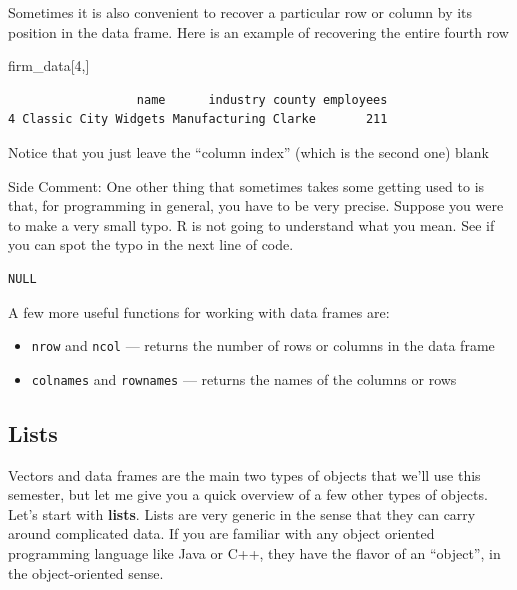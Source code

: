 \documentclass[
  letterpaper,
  DIV=11,
  numbers=noendperiod]{scrreprt}
\newenvironment{Shaded}{\begin{snugshade}}{\end{snugshade}}
\newcommand{\DecValTok}[1]{\textcolor[rgb]{0.68,0.00,0.00}{#1}}
\newcommand{\NormalTok}[1]{\textcolor[rgb]{0.00,0.23,0.31}{#1}}
\newcommand{\SpecialCharTok}[1]{\textcolor[rgb]{0.37,0.37,0.37}{#1}}
\begin{document}
Sometimes it is also convenient to recover a particular row or column by
its position in the data frame. Here is an example of recovering the
entire fourth row

\begin{Shaded}
\begin{Highlighting}[]
\NormalTok{firm\_data[}\DecValTok{4}\NormalTok{,]}
\end{Highlighting}
\end{Shaded}

\begin{verbatim}
                  name      industry county employees
4 Classic City Widgets Manufacturing Clarke       211
\end{verbatim}

Notice that you just leave the ``column index'' (which is the second
one) blank

{Side Comment:} One other thing that sometimes takes some getting used
to is that, for programming in general, you have to be very precise.
Suppose you were to make a very small typo. R is not going to understand
what you mean. See if you can spot the typo in the next line of code.

\begin{Shaded}
\end{Shaded}

\begin{verbatim}
NULL
\end{verbatim}

A few more useful functions for working with data frames are:

\begin{itemize}
\item
  \texttt{nrow} and \texttt{ncol} --- returns the number of rows or
  columns in the data frame
\item
  \texttt{colnames} and \texttt{rownames} --- returns the names of the
  columns or rows
\end{itemize}

\subsection{Lists}\label{lists}

Vectors and data frames are the main two types of objects that we'll use
this semester, but let me give you a quick overview of a few other types
of objects. Let's start with \textbf{lists}. Lists are very generic in
the sense that they can carry around complicated data. If you are
familiar with any object oriented programming language like Java or C++,
they have the flavor of an ``object'', in the object-oriented sense.
\end{document}

